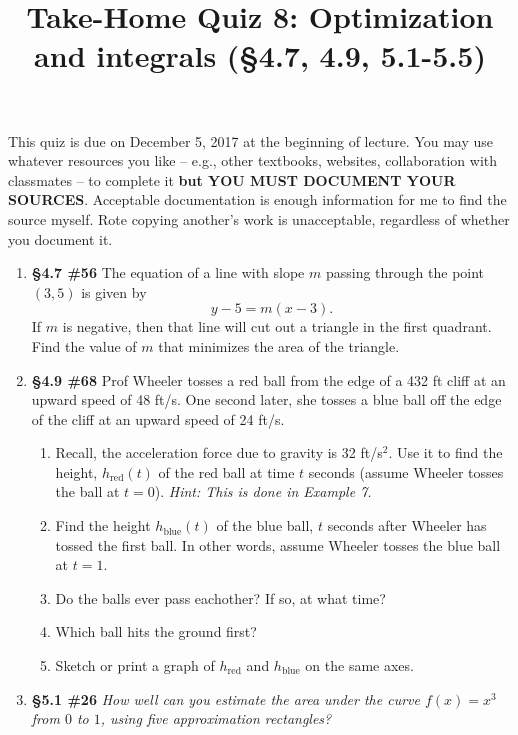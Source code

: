 \documentclass[%
]{article}
\title{\vspace{-3.5pc} 
	\flushleft \bf \Large Take-Home Quiz 8: Optimization and integrals %
	 (\S4.7, 4.9, 5.1-5.5)}
\date{}
\begin{document}
\maketitle

\vspace{-3pc}
 This quiz is due on December 5, 2017 at the beginning of lecture.  You may use whatever resources you like -- e.g., other textbooks, websites, collaboration with classmates -- to complete it \textbf{but YOU MUST DOCUMENT YOUR SOURCES}.  Acceptable documentation is enough information for me to find the source myself.  Rote copying another's work is unacceptable, regardless of whether you document it.  

\noindent\hrulefill

\begin{enumerate}

\item {\bf \S4.7 \#56} The equation of a line with slope $m$ passing through the point $(3,5)$ is given by 
\[
y-5=m(x-3).
\]
If $m$ is negative, then that line will cut out a triangle in the first quadrant.  Find the value of $m$ that minimizes the area of the triangle.


\item {\bf \S4.9 \#68} Prof Wheeler tosses a red ball from the edge of a 432 ft cliff at an upward speed of 48 ft/s.  One second later, she tosses a blue ball off the edge of the cliff at an upward speed of 24 ft/s.
	\begin{enumerate}
	\item Recall, the acceleration force due to gravity is 32 ft/s$^2$.  Use it to find the height, $h_{\text{red}}(t)$ of the red ball at time $t$ seconds (assume Wheeler tosses the ball at $t=0$).  \textit{Hint: This is done in Example 7.}
	\item Find the height $h_{\text{blue}}(t)$ of the blue ball, $t$ seconds after Wheeler has tossed the first ball.  In other words, assume Wheeler tosses the blue ball at $t=1$. 
	\item Do the balls ever pass eachother?  If so, at what time?
	\item Which ball hits the ground first?
	\item Sketch or print a graph of $h_{\text{red}}$ and $h_{\text{blue}}$ on the same axes.
	\end{enumerate}

\item {\bf \S5.1 \#26} \textit{How well can you estimate the area under the curve $f(x)=x^3$ from $0$ to $1$, using five approximation rectangles?}


\end{enumerate}
\end{document}
